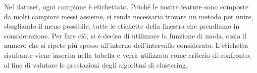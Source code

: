 Nel dataset, ogni campione è etichettato. Poiché le nostre feature sono composte da molti campioni messi assieme, si rende necessario trovare un metodo per unire, sbagliando il meno possibile, tutte le etichette della finestra che prendiamo in considerazione. Per fare ciò, si è deciso di utilizzare la funzione di moda, ossia il numero che si ripete più spesso all'interno dell'intervallo considerato. L'etichetta risultante viene inserita nella tabella e verrà utilizzata come criterio di confronto, al fine di valutare le prestazioni degli algoritmi di clustering. 
